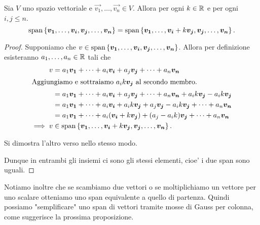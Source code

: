 \begin{proposition} \label{span_Gauss}
    Sia $V$ uno spazio vettoriale e $\vec{v_1}, \dots, \vec{v_n} \in V$. Allora per ogni $k \in \mathbb{R}$ e per ogni $i, j \leq n$.
    \begin{equation}
        \operatorname{span}\left\{\bm{v_1}, \dots, \bm{v_i}, \bm{v_j}, \dots, \bm{v_n}\right\} = \operatorname{span}\left\{\bm{v_1}, \dots, \bm{v_i} + k\bm{v_j}, \bm{v_j}, \dots, \bm{v_n}\right\}.
    \end{equation}
\end{proposition}
\begin{proof}
    Supponiamo che $v \in \operatorname{span}\left\{\bm{v_1}, \dots, \bm{v_i}, \bm{v_j}, \dots, \bm{v_n}\right\}$. Allora per definizione esisteranno $a_1, \dots, a_n \in \mathbb{R}$ tali che
    \begin{alignat*}{1}
        v &= a_1\bm{v_1} + \dots + a_i\bm{v_i} + a_j\bm{v_j} + \dots + a_n\bm{v_n} \\
        \intertext{Aggiungiamo e sottraiamo $a_ik\bm{v_j}$ al secondo membro.}
        &= a_1\bm{v_1} + \dots + a_i\bm{v_i} + a_j\bm{v_j} + \dots + a_n\bm{v_n} + a_ik\bm{v_j} - a_ik\bm{v_j}\\
        &= a_1\bm{v_1} + \dots + a_i\bm{v_i} + a_ik\bm{v_j} + a_j\bm{v_j} - a_ik\bm{v_j} + \dots + a_n\bm{v_n}\\
        &= a_1\bm{v_1} + \dots + a_i(\bm{v_i} + k\bm{v_j}) + (a_j - a_ik)\bm{v_j} + \dots + a_n\bm{v_n}\\
        \implies v &\in \operatorname{span}\left\{\bm{v_1}, \dots, \bm{v_i} + k\bm{v_j}, \bm{v_j}, \dots, \bm{v_n}\right\}. 
    \end{alignat*}

    Si dimostra l'altro verso nello stesso modo.

    Dunque in entrambi gli insiemi ci sono gli stessi elementi, cioe' i due span sono uguali.
\end{proof}

Notiamo inoltre che se scambiamo due vettori o se moltiplichiamo un vettore per uno scalare otteniamo uno span equivalente a quello di partenza. Quindi possiamo "semplificare" uno span di vettori tramite mosse di Gauss per colonna, come suggerisce la prossima proposizione.

